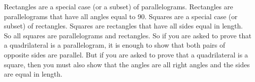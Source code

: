     \addtocounter{footnote}{-0}
    
        
\label{m39354*id9732}Rectangles are a special case (or a subset) of parallelograms. Rectangles are parallelograms that have all angles equal to 90. Squares are a special case (or subset) of rectangles. Squares are rectangles that have all sides equal in length. So all squares are parallelograms and rectangles. So if you are asked to prove that a quadrilateral is a parallelogram, it is enough to show that both pairs of opposite sides are parallel. But if you are asked to prove that a quadrilateral is a square, then you must also show that the angles are all right angles and the sides are equal in length.
\par 
      
%       
%             
%       
%             
%         
%             
